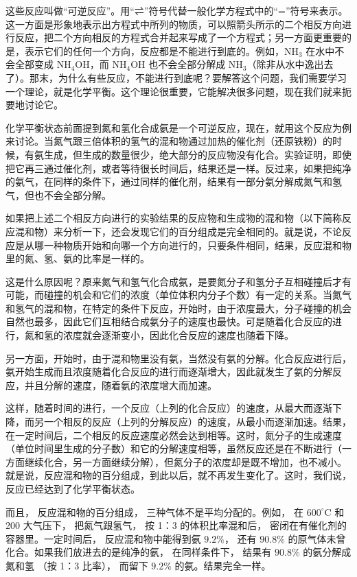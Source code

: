 这些反应叫做``可逆反应''。用``⇌''符号代替一般化学方程式中的``=''符号来表示。这一方面是形象地表示出方程式中所列的物质，可以照箭头所示的二个相反方向进行反应，把二个方向相反的方程式合并起来写成了一个方程式；另一方面更重要的是，表示它们的任何一个方向，反应都是不能进行到底的。例如，\(\mathrm{NH}_{3}\)
在水中不会全部变成 \(\mathrm{NH}_{4} \mathrm{OH}\)，而
\(\mathrm{NH}_{4} \mathrm{OH}\) 也不会全部分解成
\(\mathrm{NH}_{3}\)（除非从水中逸出去了）。那末，为什么有些反应，不能进行到底呢？要解答这个问题，我们需要学习一个理论，就是化学平衡。这个理论很重要，它能解决很多问题，现在我们就来扼要地讨论它。

化学平衡状态前面提到氮和氢化合成氨是一个可逆反应，现在，就用这个反应为例来讨论。当氮气跟三倍体积的氢气的混和物通过加热的催化剂（还原铁粉）的时候，有氨生成，但生成的数量很少，绝大部分的反应物没有化合。实验证明，即使把它再三通过催化剂，或者等待很长时间后，结果还是一样。反过来，如果把纯净的氨气，在同样的条件下，通过同样的催化剂，结果有一部分氨分解成氮气和氢气，但也不会全部分解。

如果把上述二个相反方向进行的实验结果的反应物和生成物的混和物（以下简称反应混和物）来分析一下，还会发现它们的百分组成是完全相同的。就是说，不论反应是从哪一种物质开始和向哪一个方向进行的，只要条件相同，结果，反应混和物里的氮、氢、氨的比率是一样的。

这是什么原因呢？原来氮气和氢气化合成氨，是要氮分子和氢分子互相碰撞后才有可能，而碰撞的机会和它们的浓度（单位体积内分子个数）有一定的关系。当氮气和氢气的混和物，在特定的条件下反应，开始时，由于浓度最大，分子碰撞的机会自然也最多，因此它们互相结合成氨分子的速度也最快。可是随着化合反应的进行，氮和氢的浓度就会逐渐变小，因此化合反应的速度也随着下降。

另一方面，开始时，由于混和物里没有氨，当然没有氨的分解。化合反应进行后，氨开始生成而且浓度随着化合反应的进行而逐渐增大，因此就发生了氨的分解反应，并且分解的速度，随着氨的浓度增大而加速。

这样，随着时间的进行，一个反应（上列的化合反应）的速度，从最大而逐渐下降，而另一个相反的反应（上列的分解反应）的速度，从最小而逐渐加速。结果，在一定时间后，二个相反的反应速度必然会达到相等。这时，氮分子的生成速度（单位时间里生成的分子数）和它的分解速度相等，虽然反应还是在不断进行（一方面继续化合，另一方面继续分解），但氮分子的浓度却是既不增加，也不减小。就是说，反应混和物的百分组成，到此以后，就不再发生变化了。这时，我们说，反应已经达到了化学平衡状态。

而且， 反应混和物的百分组成， 三种气体不是平均分配的。例如， 在
\(600^{\circ} \mathrm{C}\) 和 200 大气压下， 把氮气跟氢气， 按 1：3
的体积比率混和后， 密闭在有催化剂的容器里。一定时间后，
反应混和物中能得到氨 \(9.2\%\)， 还有 \(90.8\%\)
的原气体未曾化合。如果我们放进去的是纯净的氨， 在同样条件下， 结果有
\(90.8\%\) 的氨分解成氮和氢 （按 1：3 比率）， 而留下 \(9.2\%\)
的氨。结果完全一样。

